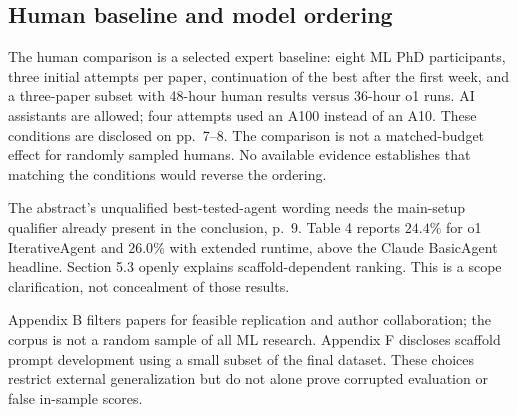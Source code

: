 \documentclass[10pt]{article}
\begin{document}
\subsection*{Human baseline and model ordering}
The human comparison is a selected expert baseline: eight ML PhD participants, three initial attempts per paper, continuation of the best after the first week, and a three-paper subset with 48-hour human results versus 36-hour o1 runs. AI assistants are allowed; four attempts used an A100 instead of an A10. These conditions are disclosed on pp. 7–8. The comparison is not a matched-budget effect for randomly sampled humans. No available evidence establishes that matching the conditions would reverse the ordering.\par
The abstract’s unqualified best-tested-agent wording needs the main-setup qualifier already present in the conclusion, p. 9. Table 4 reports \(24.4\%\) for o1 IterativeAgent and \(26.0\%\) with extended runtime, above the Claude BasicAgent headline. Section 5.3 openly explains scaffold-dependent ranking. This is a scope clarification, not concealment of those results.\par
Appendix B filters papers for feasible replication and author collaboration; the corpus is not a random sample of all ML research. Appendix F discloses scaffold prompt development using a small subset of the final dataset. These choices restrict external generalization but do not alone prove corrupted evaluation or false in-sample scores.\par
\end{document}

